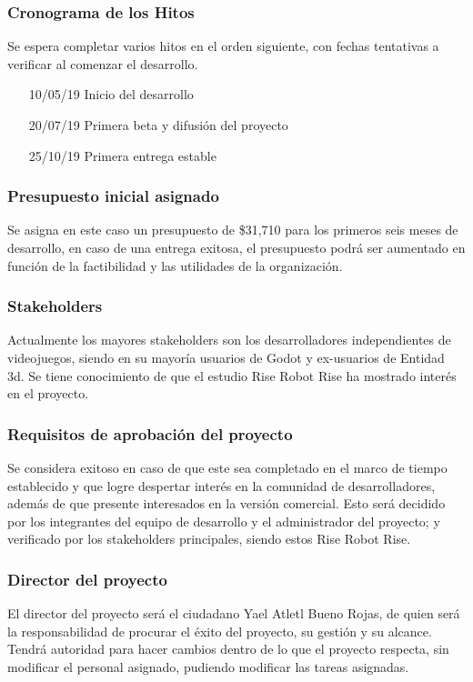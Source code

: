 \documentclass[]{article}
\begin{document}
\subsubsection{Cronograma de los Hitos}
Se espera completar varios hitos en el orden siguiente, con fechas tentativas a verificar al comenzar el desarrollo. 
\begin{itemize}
	\item[10/05/19] Inicio del desarrollo
	\item[20/07/19] Primera beta y difusi\'on del proyecto
	\item[25/10/19] Primera entrega estable
\end{itemize}
\subsubsection{Presupuesto inicial asignado}
Se asigna en este caso un presupuesto de \$31,710 para los primeros seis meses de desarrollo, en caso de una entrega exitosa, el presupuesto podr\'a ser aumentado en funci\'on de la factibilidad y las utilidades de la organizaci\'on. 
\subsubsection{Stakeholders}
Actualmente los mayores stakeholders son los desarrolladores independientes de videojuegos, siendo en su mayor\'ia usuarios de Godot y ex-usuarios de Entidad 3d. Se tiene conocimiento de que el estudio Rise Robot Rise ha mostrado inter\'es en el proyecto. 
\subsubsection{Requisitos de aprobaci\'on del proyecto}
Se considera exitoso en caso de que este sea completado en el marco de tiempo establecido y que logre despertar inter\'es en la comunidad de desarrolladores, adem\'as de que presente interesados en la versi\'on comercial. 
Esto ser\'a decidido por los integrantes del equipo de desarrollo y el administrador del proyecto; y verificado por los stakeholders principales, siendo estos Rise Robot Rise. 

\subsubsection{Director del proyecto}
El director del proyecto ser\'a el ciudadano Yael Atletl Bueno Rojas, de quien ser\'a la responsabilidad de procurar el \'exito del proyecto, su gesti\'on y su alcance. Tendr\'a autoridad para hacer cambios dentro de lo que el proyecto respecta, sin modificar el personal asignado, pudiendo modificar las tareas asignadas. 
\end{document}
